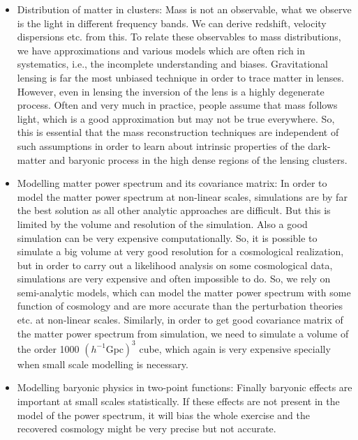 \documentclass[
  11pt,
  twoside,
  openright,
  titlepage,
  headings=optiontoheadandtoc
]{scrbook}
\begin{document}
\begin{itemize}
	\item Distribution of matter in clusters: Mass is not an observable, what we 
			observe is the light in different frequency bands. We can derive 
			redshift, velocity dispersions etc. from this. To relate these observables
			to mass distributions, we have approximations and various models which
			are often rich in systematics, i.e., the incomplete understanding and 
			biases. Gravitational lensing is far the most unbiased technique in order
			to trace matter in lenses. However, even in lensing the inversion of the lens
			is a highly degenerate process. Often and very much in 
			practice, people assume that mass follows light, which is a good approximation
			but may not be true everywhere. So, this is essential that the 
			mass reconstruction techniques are independent of such assumptions in order
			to learn about intrinsic properties of the dark-matter and baryonic
			process in the high dense regions of the lensing clusters.

	\item Modelling matter power spectrum and its covariance matrix: In order to model
			the matter power spectrum at non-linear scales, simulations are by far the 
			best solution as all other analytic approaches are difficult. But this is limited
			by the volume and resolution of the simulation. Also a good simulation
			can be very expensive computationally. So, it is possible to simulate a big
			volume at very good resolution for a cosmological realization, but in order
			to carry out a likelihood analysis on some cosmological data, simulations are
			very expensive and often impossible to do. So, we rely on semi-analytic models, 
			which can model the matter power spectrum with some function of cosmology
			and are more accurate than the perturbation theories etc. at non-linear 
			scales. Similarly, in order to get good covariance matrix of the matter power
			spectrum from simulation, we need to simulate a volume of the order 
			1000 $(h^{-1} \mathrm{Gpc})^3$
			cube, which again is very expensive specially when small scale modelling 
			is necessary. 

	\item Modelling baryonic physics in two-point functions: Finally baryonic effects are 
			important at small scales statistically. If these effects are not present
			in the model of the power spectrum, it will bias the whole exercise and
			the recovered cosmology might be very precise but not accurate. 
\end{itemize}
\end{document}
